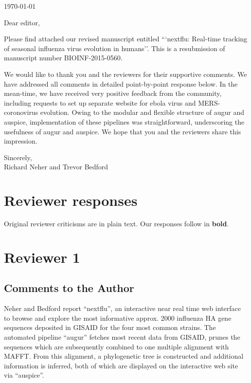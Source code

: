 \documentclass[11pt,oneside,letterpaper]{article}
\begin{document}

\today

\vspace{1cm}

Dear editor,

Please find attached our revised manuscript entitled ```nextflu: Real-time tracking of seasonal influenza virus evolution in humans''.  This is a resubmission of manuscript number BIOINF-2015-0560.

We would like to thank you and the reviewers for their supportive comments. We have addressed all comments in detailed point-by-point response below. In the mean-time, we have received very positive feedback from the community, including requests to set up separate website for ebola virus and MERS-coronovirus evolution. Owing to the modular and flexible structure of augur and auspice, implementation of these pipelines was straightforward, underscoring the usefulness of augur and auspice. We hope that you and the reviewers share this impression.

Sincerely,\\
Richard Neher and Trevor Bedford

\restoregeometry

\newpage

\section*{Reviewer responses}

Original reviewer criticisms are in plain text.  Our responses follow in \textbf{bold}.  


\section*{Reviewer 1}

\subsection*{Comments to the Author}

Neher and Bedford report ``nextflu'', an interactive near real time web interface to browse and explore the most informative approx. 2000 influenza HA gene sequences deposited in GISAID for the four most common strains. The automated pipeline ``augur'' fetches most recent data from GISAID, prunes the sequences which are subsequently combined to one multiple alignment with MAFFT. From this alignment, a phylogenetic tree is constructed and additional information is inferred, both of which are displayed on the interactive web site via ``auspice''.
\end{document}
